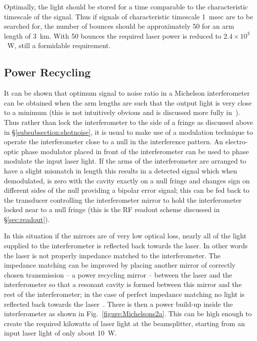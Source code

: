 \documentclass{article}
\begin{document}
Optimally, the light should be stored for a time comparable to the
characteristic timescale of the signal. Thus if signals of characteristic
timescale 1~msec are to be searched for, the number of bounces should be
approximately 50 for an arm length of 3~km. With 50 bounces the required laser
power is reduced to $2.4 \times 10^3$~W, still a formidable requirement.



\subsection{Power Recycling}
\label{subsection:powerrec}

It can be shown that optimum signal to noise ratio in a Michelson interferometer
can be obtained when the arm lengths are such that the output light is very
close to a minimum (this is not intuitively obvious and is discussed more fully
in~\cite{Edelstein}). Thus rather than lock the interferometer to the side of a
fringe as discussed above in \S\ref{subsubsection:shotnoise}, it is usual
to make use of a modulation technique to operate the interferometer close to a
null in the interference pattern. An electro-optic phase modulator placed in
front of the interferometer can be used to phase modulate the input laser light.
If the arms of the interferometer are arranged to have a slight mismatch in
length this results in a detected signal which when demodulated, is zero with
the cavity exactly on a null fringe and changes sign on different sides of the
null providing a bipolar error signal; this can be fed back to the transducer
controlling the interferometer mirror to hold the interferometer locked near to
a null fringe (this is the RF readout scheme discussed in \S\ref{sec:readout}).

In this situation if the mirrors are of very low optical loss, nearly all of the
light supplied to the interferometer is reflected back towards the laser. In
other words the laser is not properly impedance matched to the interferometer.
The impedance matching can be improved by placing another mirror of correctly
chosen transmission -- a power recycling mirror -- between the laser and the
interferometer so that a resonant cavity is formed between this mirror and the
rest of the interferometer; in the case of perfect impedance matching no light
is reflected back towards the laser~\cite{Drever3, Schilling}. There is then a
power build-up inside the interferometer as shown in 
Fig.~\ref{figure:Michelsons2a}. This can be high enough to create the required
kilowatts of laser light at the beamsplitter, starting from an input laser light
of only about 10~W.
\end{document}
